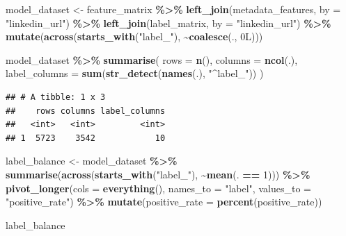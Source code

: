 \documentclass[
]{article}
\newenvironment{Shaded}{\begin{snugshade}}{\end{snugshade}}
\newcommand{\AttributeTok}[1]{\textcolor[rgb]{0.13,0.29,0.53}{#1}}
\newcommand{\DataTypeTok}[1]{\textcolor[rgb]{0.13,0.29,0.53}{#1}}
\newcommand{\DecValTok}[1]{\textcolor[rgb]{0.00,0.00,0.81}{#1}}
\newcommand{\FunctionTok}[1]{\textcolor[rgb]{0.13,0.29,0.53}{\textbf{#1}}}
\newcommand{\NormalTok}[1]{#1}
\newcommand{\OtherTok}[1]{\textcolor[rgb]{0.56,0.35,0.01}{#1}}
\newcommand{\SpecialCharTok}[1]{\textcolor[rgb]{0.81,0.36,0.00}{\textbf{#1}}}
\newcommand{\StringTok}[1]{\textcolor[rgb]{0.31,0.60,0.02}{#1}}
\begin{document}
\begin{Shaded}
\begin{Highlighting}[]
\NormalTok{model\_dataset }\OtherTok{\textless{}{-}}\NormalTok{ feature\_matrix }\SpecialCharTok{\%\textgreater{}\%}
  \FunctionTok{left\_join}\NormalTok{(metadata\_features, }\AttributeTok{by =} \StringTok{"linkedin\_url"}\NormalTok{) }\SpecialCharTok{\%\textgreater{}\%}
  \FunctionTok{left\_join}\NormalTok{(label\_matrix, }\AttributeTok{by =} \StringTok{"linkedin\_url"}\NormalTok{) }\SpecialCharTok{\%\textgreater{}\%}
  \FunctionTok{mutate}\NormalTok{(}\FunctionTok{across}\NormalTok{(}\FunctionTok{starts\_with}\NormalTok{(}\StringTok{"label\_"}\NormalTok{), }\SpecialCharTok{\textasciitilde{}}\FunctionTok{coalesce}\NormalTok{(., }\DecValTok{0}\DataTypeTok{L}\NormalTok{)))}

\NormalTok{model\_dataset }\SpecialCharTok{\%\textgreater{}\%}
  \FunctionTok{summarise}\NormalTok{(}
    \AttributeTok{rows =} \FunctionTok{n}\NormalTok{(),}
    \AttributeTok{columns =} \FunctionTok{ncol}\NormalTok{(.),}
    \AttributeTok{label\_columns =} \FunctionTok{sum}\NormalTok{(}\FunctionTok{str\_detect}\NormalTok{(}\FunctionTok{names}\NormalTok{(.), }\StringTok{"\^{}label\_"}\NormalTok{))}
\NormalTok{  )}
\end{Highlighting}
\end{Shaded}

\begin{verbatim}
## # A tibble: 1 x 3
##    rows columns label_columns
##   <int>   <int>         <int>
## 1  5723    3542            10
\end{verbatim}

\begin{Shaded}
\begin{Highlighting}[]
\NormalTok{label\_balance }\OtherTok{\textless{}{-}}\NormalTok{ model\_dataset }\SpecialCharTok{\%\textgreater{}\%}
  \FunctionTok{summarise}\NormalTok{(}\FunctionTok{across}\NormalTok{(}\FunctionTok{starts\_with}\NormalTok{(}\StringTok{"label\_"}\NormalTok{), }\SpecialCharTok{\textasciitilde{}}\FunctionTok{mean}\NormalTok{(. }\SpecialCharTok{==} \DecValTok{1}\NormalTok{))) }\SpecialCharTok{\%\textgreater{}\%}
  \FunctionTok{pivot\_longer}\NormalTok{(}\AttributeTok{cols =} \FunctionTok{everything}\NormalTok{(), }\AttributeTok{names\_to =} \StringTok{"label"}\NormalTok{, }\AttributeTok{values\_to =} \StringTok{"positive\_rate"}\NormalTok{) }\SpecialCharTok{\%\textgreater{}\%}
  \FunctionTok{mutate}\NormalTok{(}\AttributeTok{positive\_rate =} \FunctionTok{percent}\NormalTok{(positive\_rate))}

\NormalTok{label\_balance}
\end{Highlighting}
\end{Shaded}
\end{document}
